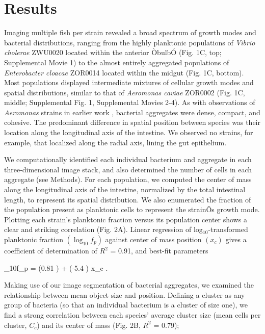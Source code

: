  \section{Results}




Imaging multiple fish per strain revealed a broad spectrum of growth modes and bacterial distributions, ranging from the highly planktonic populations of \textit{Vibrio cholerae} ZWU0020 located within the anterior ÒbulbÓ (Fig. 1C, top; Supplemental Movie 1) to the almost entirely aggregated populations of \textit{Enterobacter cloacae} ZOR0014 located within the midgut (Fig. 1C, bottom). Most populations displayed intermediate mixtures of cellular growth modes and spatial distributions, similar to that of \textit{Aeromonas caviae} ZOR0002 (Fig. 1C, middle; Supplemental Fig. 1, Supplemental Movies 2-4). As with observations of \textit{Aeromonas} strains in earlier work \cite{wiles_host_2016}, bacterial aggregates were dense, compact, and cohesive. The predominant difference in spatial position between species was their location along the longitudinal axis of the intestine. We observed no strains, for example, that localized along the radial axis, lining the gut epithelium.	

We computationally identified each individual bacterium and aggregate in each three-dimensional image stack, and also determined the number of cells in each aggregate \cite{jemielita_spatial_2014} (see Methods). For each population, we computed the center of mass along the longitudinal axis of the intestine, normalized by the total intestinal length, to represent its spatial distribution. We also enumerated the fraction of the population present as planktonic cells to represent the strainÕs growth mode. Plotting each strain's planktonic fraction versus its population center shows a clear and striking correlation (Fig. 2A). Linear regression of log$_{10}$-transformed planktonic fraction $(\log_{10}f_p)$ against center of mass position $(x_c)$ gives a coefficient of determination of $R^2$ = 0.91, and best-fit parameters	

\be
        	 \log_{10}f_p = (0.81 ) + (-5.4 ) x_c .	
\ee

Making use of our image segmentation of bacterial aggregates, we examined the relationship between mean object size and position. Defining a cluster as any group of bacteria (so that an individual bacterium is a cluster of size one), we find a strong correlation between each species' average cluster size (mean cells per cluster, $C_c$) and its center of mass (Fig. 2B, $R^2$ = 0.79);

